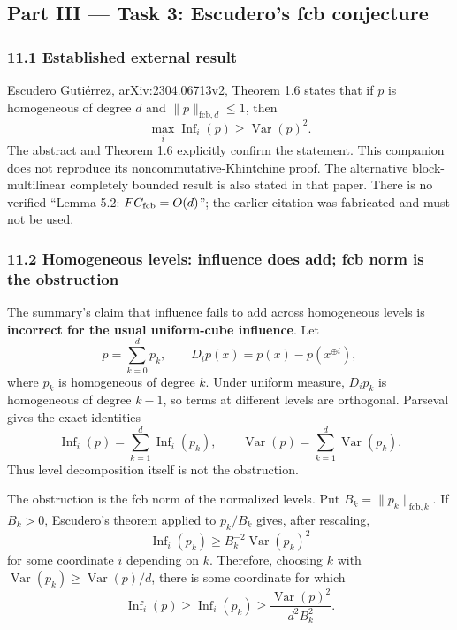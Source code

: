 \subsection{Part III --- Task 3: Escudero's fcb conjecture}\label{part-iii-task-3-escuderos-fcb-conjecture}

\subsubsection{11.1 Established external result}\label{established-external-result}

Escudero Gutiérrez, arXiv:2304.06713v2, Theorem 1.6 states that if \(p\) is homogeneous of degree \(d\) and \(\|p\|_{\mathrm{fcb},d}\le1\), then
\[\max_i\operatorname{Inf}_i(p)\ge\operatorname{Var}(p)^2.\]
The abstract and Theorem 1.6 explicitly confirm the statement. This companion does not reproduce its noncommutative-Khintchine proof. The alternative block-multilinear completely bounded result is also stated in that paper. There is no verified ``Lemma 5.2: \(FC_{\rm fcb}=O(d)\)''; the earlier citation was fabricated and must not be used.

\subsubsection{11.2 Homogeneous levels: influence does add; fcb norm is the obstruction}\label{homogeneous-levels-influence-does-add-fcb-norm-is-the-obstruction}

The summary's claim that influence fails to add across homogeneous levels is \textbf{incorrect for the usual uniform-cube influence}. Let
\[p=\sum_{k=0}^dp_k,\qquad D_ip(x)=p(x)-p(x^{\oplus i}),\]
where \(p_k\) is homogeneous of degree \(k\). Under uniform measure, \(D_ip_k\) is homogeneous of degree \(k-1\), so terms at different levels are orthogonal. Parseval gives the exact identities
\[
\operatorname{Inf}_i(p)=\sum_{k=1}^d\operatorname{Inf}_i(p_k),
\qquad
\operatorname{Var}(p)=\sum_{k=1}^d\operatorname{Var}(p_k).
\]
Thus level decomposition itself is not the obstruction.

The obstruction is the fcb norm of the normalized levels. Put \(B_k=\|p_k\|_{\mathrm{fcb},k}\). If \(B_k>0\), Escudero's theorem applied to \(p_k/B_k\) gives, after rescaling,
\[\operatorname{Inf}_i(p_k)\ge B_k^{-2}\operatorname{Var}(p_k)^2\]
for some coordinate \(i\) depending on \(k\). Therefore, choosing \(k\) with \(\operatorname{Var}(p_k)\ge\operatorname{Var}(p)/d\), there is some coordinate for which
\[
\operatorname{Inf}_i(p)
\ge\operatorname{Inf}_i(p_k)
\ge\frac{\operatorname{Var}(p)^2}{d^2B_k^2}. \tag{fcb-level}
\]

